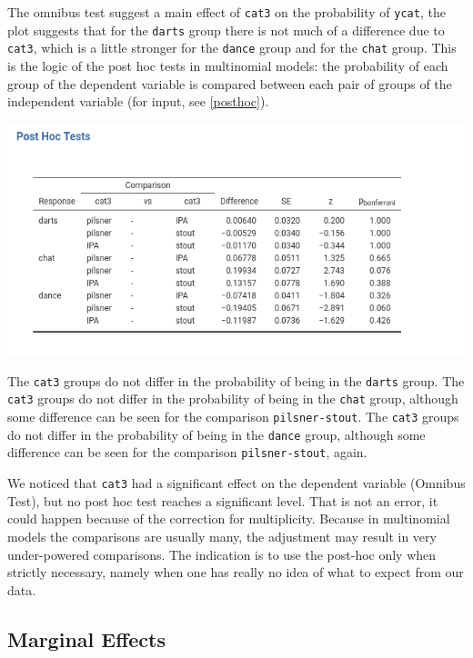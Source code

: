 \documentclass[
]{book}
\begin{document}
The omnibus test suggest a main effect of \texttt{cat3} on the probability of \texttt{ycat}, the plot suggests that for the \texttt{darts} group there is not much of a difference due to \texttt{cat3}, which is a little stronger for the \texttt{dance} group and for the \texttt{chat} group. This is the logic of the post hoc tests in multinomial models: the probability of each group of the dependent variable is compared between each pair of groups of the independent variable (for input, see \ref{posthoc}).

\includegraphics{bookletpics/3_multi_output6.png}

The \texttt{cat3} groups do not differ in the probability of being in the \texttt{darts} group. The \texttt{cat3} groups do not differ in the probability of being in the \texttt{chat} group, although some difference can be seen for the comparison \texttt{pilsner-stout}. The \texttt{cat3} groups do not differ in the probability of being in the \texttt{dance} group, although some difference can be seen for the comparison \texttt{pilsner-stout}, again.

We noticed that \texttt{cat3} had a significant effect on the dependent variable ({Omnibus Test}), but no post hoc test reaches a significant level. That is not an error, it could happen because of the correction for multiplicity. Because in multinomial models the comparisons are usually many, the adjustment may result in very under-powered comparisons. The indication is to use the post-hoc only when strictly necessary, namely when one has really no idea of what to expect from our data.

\hypertarget{marginal-effects}{%
\subsection{Marginal Effects}\label{marginal-effects}}
\end{document}
